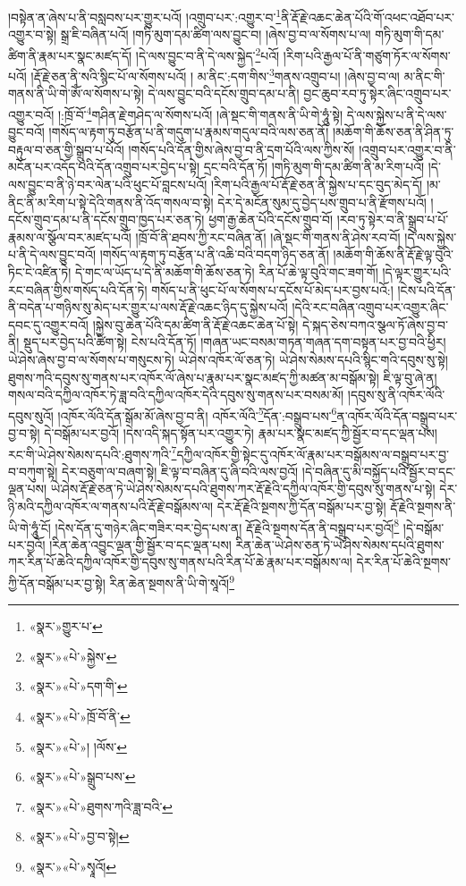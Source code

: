 །བསྟེན་ན་ཞེས་པ་ནི་བསླབས་པར་གྱུར་པའོ། །འགྲུབ་པར་:འགྱུར་བ་\footnote{«སྣར་»གྱུར་པ་}ནི་རྡོ་རྗེ་འཆང་ཆེན་པོའི་གོ་འཕང་འཐོབ་པར་འགྱུར་བ་སྟེ། སྒྲ་ཇི་བཞིན་པའོ། །གཏི་མུག་དམ་ཚིག་ལས་བྱུང་བ། །ཞེས་བྱ་བ་ལ་སོགས་པ་ལ། གཏི་མུག་གི་དམ་ཚིག་ནི་རྣམ་པར་སྣང་མཛད་དོ། །དེ་ལས་བྱུང་བ་ནི་དེ་ལས་སྐྱེད་\footnote{«སྣར་»«པེ་»སྐྱེས་}པའོ། །རིག་པའི་རྒྱལ་པོ་ནི་གཙུག་ཏོར་ལ་སོགས་པའོ། །རྡོ་རྗེ་ཅན་ནི་སའི་སྙིང་པོ་ལ་སོགས་པའོ། །
མ་ནིང་:དག་གིས་\footnote{«སྣར་»«པེ་»དག་གི་}གནས་འགྲུབ་པ། །ཞེས་བྱ་བ་ལ། མ་ནིང་གི་གནས་ནི་ཡི་གེ་ཨོཾ་ལ་སོགས་པ་སྟེ། དེ་ལས་བྱུང་བའི་དངོས་གྲུབ་དམ་པ་ནི། བྱང་ཆུབ་རབ་ཏུ་སྟེར་ཞིང་འགྲུབ་པར་འགྱུར་བའོ། །:ཁྲོ་བོ་\footnote{«སྣར་»«པེ་»ཁྲོ་བོ་ནི་}གཤིན་རྗེ་གཤེད་ལ་སོགས་པའོ། །ཞེ་སྡང་གི་གནས་ནི་ཡི་གེ་ཧཱུཾ་སྟེ། དེ་ལས་སྐྱེས་པ་ནི་དེ་ལས་བྱུང་བའོ། །གསོད་ལ་རྟག་ཏུ་བརྩོན་པ་ནི་གདུག་པ་རྣམས་གདུལ་བའི་ལས་ཅན་ནོ། །མཆོག་གི་ཆོས་ཅན་ནི་ཤིན་ཏུ་བརྟུལ་བ་ཅན་གྱི་སྒྲུབ་པ་པོའོ། །གསོད་པའི་དོན་གྱིས་ཞེས་བྱ་བ་ནི་དྲག་པོའི་ལས་ཀྱིས་སོ། །འགྲུབ་པར་འགྱུར་བ་ནི་མངོན་པར་འདོད་པའི་དོན་འགྲུབ་པར་བྱེད་པ་སྟེ། དྲང་བའི་དོན་ཏོ། །གཏི་མུག་གི་དམ་ཚིག་ནི་མ་རིག་པའོ། །དེ་ལས་བྱུང་བ་ནི་ཉེ་བར་ལེན་པའི་ཕུང་པོ་བླངས་པའོ། །རིག་པའི་རྒྱལ་པོ་རྡོ་རྗེ་ཅན་ནི་སྐྱེས་པ་དང་བུད་མེད་དོ། །མ་ནིང་ནི་མ་རིག་པ་སྟེ་དེའི་གནས་ནི་འོད་གསལ་བ་སྟེ། དེར་དེ་མངོན་སུམ་དུ་བྱེད་པས་གྲུབ་པ་ནི་རྫོགས་པའོ། །དངོས་གྲུབ་དམ་པ་ནི་དངོས་གྲུབ་ཁྱད་པར་ཅན་ཏེ། ཕྱག་རྒྱ་ཆེན་པོའི་དངོས་གྲུབ་བོ། །རབ་ཏུ་སྟེར་བ་ནི་སྒྲུབ་པ་པོ་རྣམས་ལ་སྩོལ་བར་མཛད་པའོ། །ཁྲོ་བོ་ནི་ཐབས་ཀྱི་རང་བཞིན་ནོ། །ཞེ་སྡང་གི་གནས་ནི་ཤེས་རབ་བོ། །དེ་ལས་སྐྱེས་པ་ནི་དེ་ལས་བྱུང་བའོ། །གསོད་ལ་རྟག་ཏུ་བརྩོན་པ་ནི་འཆི་བའི་བདག་ཉིད་ཅན་ནོ། །མཆོག་གི་ཆོས་ནི་རྡོ་རྗེ་ལྟ་བུའི་ཏིང་ངེ་འཛིན་ཏེ། དེ་གང་ལ་ཡོད་པ་དེ་ནི་མཆོག་གི་ཆོས་ཅན་ཏེ། རིན་པོ་ཆེ་ལྟ་བུའི་གང་ཟག་གོ། །དེ་ལྟར་གྱུར་པའི་རང་བཞིན་གྱིས་གསོད་པའི་དོན་ཏེ། གསོད་པ་ནི་ཕུང་པོ་ལ་སོགས་པ་དངོས་པོ་མེད་པར་བྱས་པའོ:། །ངེས་པའི་དོན་ནི་བདེན་པ་གཉིས་སུ་མེད་པར་གྱུར་པ་ལས་རྡོ་རྗེ་འཆང་ཉིད་དུ་སྐྱེས་པའོ། །དེའི་རང་བཞིན་འགྲུབ་པར་འགྱུར་ཞིང་དབང་དུ་འགྱུར་བའོ། །སྐྱེས་བུ་ཆེན་པོའི་དམ་ཚིག་ནི་རྡོ་རྗེ་འཆང་ཆེན་པོ་སྟེ། དེ་སྐད་ཅེས་བཀའ་སྩལ་ཏོ་ཞེས་བྱ་བ་ནི། སྡུད་པར་བྱེད་པའི་ཚིག་སྟེ། ངེས་པའི་དོན་ཏོ། །གཞན་ཡང་བསམ་གཏན་གཞན་དག་བསྟན་པར་བྱ་བའི་ཕྱིར། ཡེ་ཤེས་ཞེས་བྱ་བ་ལ་སོགས་པ་གསུངས་ཏེ། ཡེ་ཤེས་འཁོར་ལོ་ཅན་ཏེ། ཡེ་ཤེས་སེམས་དཔའི་སྙིང་གའི་དབུས་སུ་སྟེ། ཐུགས་ཀའི་དབུས་སུ་གནས་པར་འཁོར་ལོ་ཞེས་པ་རྣམ་པར་སྣང་མཛད་ཀྱི་མཚན་མ་བསྒོམ་སྟེ། ཇི་ལྟ་བུ་ཞེ་ན། གསལ་བའི་དཀྱིལ་འཁོར་ཏེ་ཟླ་བའི་དཀྱིལ་འཁོར་དེའི་དབུས་སུ་གནས་པར་བསམ་མོ། །དབུས་སུ་ནི་འཁོར་ལོའི་དབུས་སུའོ། །འཁོར་ལོའི་དོན་སྒོམ་མོ་ཞེས་བྱ་བ་ནི། འཁོར་ལོའི་\footnote{«སྣར་»«པེ་»། །ལོས་}དོན་:བསྒྲུབ་པས་\footnote{«སྣར་»«པེ་»སྒྲུབ་པས་}ན་འཁོར་ལོའི་དོན་བསྒྲུབ་པར་བྱ་བ་སྟེ། དེ་བསྒོམ་པར་བྱའོ། །དེས་འདི་སྐད་སྟོན་པར་འགྱུར་ཏེ། རྣམ་པར་སྣང་མཛད་ཀྱི་སྦྱོར་བ་དང་ལྡན་པས། རང་གི་ཡེ་ཤེས་སེམས་དཔའི་:ཐུགས་ཀའི་\footnote{«སྣར་»«པེ་»ཐུགས་ཀའི་ཟླ་བའི་}དཀྱིལ་འཁོར་གྱི་སྟེང་དུ་འཁོར་ལོ་རྣམ་པར་བསྒོམས་ལ་བསྒྲུབ་པར་བྱ་བ་བཀུག་སྟེ། དེར་བཅུག་ལ་བཞག་སྟེ། ཇི་ལྟ་བ་བཞིན་དུ་ཞི་བའི་ལས་བྱའོ། །དེ་བཞིན་དུ་མི་བསྐྱོད་པའི་སྦྱོར་བ་དང་ལྡན་པས། ཡེ་ཤེས་རྡོ་རྗེ་ཅན་ཏེ་ཡེ་ཤེས་སེམས་དཔའི་ཐུགས་ཀར་རྡོ་རྗེའི་དཀྱིལ་འཁོར་གྱི་དབུས་སུ་གནས་པ་སྟེ། དེར་ཉི་མའི་དཀྱིལ་འཁོར་ལ་གནས་པའི་རྡོ་རྗེ་བསྒོམས་ལ། དེར་རྡོ་རྗེའི་སྔགས་ཀྱི་དོན་བསྒོམ་པར་བྱ་སྟེ། རྡོ་རྗེའི་སྔགས་ནི་ཡི་གེ་ཧཱུཾ་ངོ། །དེས་དོན་དུ་གཉེར་ཞིང་གཟིར་བར་བྱེད་པས་ན། རྡོ་རྗེའི་སྔགས་དོན་ནི་བསྒྲུབ་པར་བྱའོ།\footnote{«སྣར་»«པེ་»བྱ་བ་སྟེ།} །དེ་བསྒོམ་པར་བྱའོ། །རིན་ཆེན་འབྱུང་ལྡན་གྱི་སྦྱོར་བ་དང་ལྡན་པས། རིན་ཆེན་ཡེ་ཤེས་ཅན་ཏེ་ཡེ་ཤེས་སེམས་དཔའི་ཐུགས་ཀར་རིན་པོ་ཆེའི་དཀྱིལ་འཁོར་གྱི་དབུས་སུ་གནས་པའི་རིན་པོ་ཆེ་རྣམ་པར་བསྒོམས་ལ། དེར་རིན་པོ་ཆེའི་སྔགས་ཀྱི་དོན་བསྒོམ་པར་བྱ་སྟེ། རིན་ཆེན་སྔགས་ནི་ཡི་གེ་སཱའོ།\footnote{«སྣར་»«པེ་»སྭཱའོ།} 